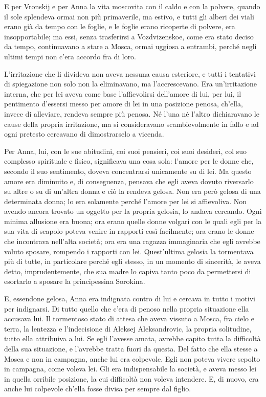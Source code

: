 E per Vronskij e per Anna la vita moscovita con il caldo e con la polvere, quando il sole splendeva ormai non più primaverile, ma estivo, e tutti gli alberi dei viali erano già da tempo con le foglie, e le foglie erano ricoperte di polvere, era insopportabile; ma essi, senza trasferirsi a Vozdvizenskoe, come era stato deciso da tempo, continuavano a stare a Mosca, ormai uggiosa a entrambi, perché negli ultimi tempi non c'era accordo fra di loro. 

L'irritazione che li divideva non aveva nessuna causa esteriore, e tutti i tentativi di spiegazione non solo non la eliminavano, ma l'accrescevano. Era un'irritazione interna, che per lei aveva come base l'affievolirsi dell'amore di lui, per lui, il pentimento d'essersi messo per amore di lei in una posizione penosa, ch'ella, invece di alleviare, rendeva sempre più penosa. Né l'una né l'altro dichiaravano le cause della propria irritazione, ma si consideravano scambievolmente in fallo e ad ogni pretesto cercavano di dimostrarselo a vicenda. 

Per Anna, lui, con le sue abitudini, coi suoi pensieri, coi suoi desideri, col suo complesso spirituale e fisico, significava una cosa sola: l'amore per le donne che, secondo il suo sentimento, doveva concentrarsi unicamente su di lei. Ma questo amore era diminuito e, di conseguenza, pensava che egli aveva dovuto riversarlo su altre o su di un'altra donna e ciò la rendeva gelosa. Non era però gelosa di una determinata donna; lo era solamente perché l'amore per lei si affievoliva. Non avendo ancora trovato un oggetto per la propria gelosia, lo andava cercando. Ogni minima allusione era buona; ora erano quelle donne volgari con le quali egli per la sua vita di scapolo poteva venire in rapporti così facilmente; ora erano le donne che incontrava nell'alta società; ora era una ragazza immaginaria che egli avrebbe voluto sposare, rompendo i rapporti con lei. Quest'ultima gelosia la tormentava più di tutte, in particolare perché egli stesso, in un momento di sincerità, le aveva detto, imprudentemente, che sua madre lo capiva tanto poco da permettersi di esortarlo a sposare la principessina Sorokina. 

E, essendone gelosa, Anna era indignata contro di lui e cercava in tutto i motivi per indignarsi. Di tutto quello che c'era di penoso nella propria situazione ella accusava lui. Il tormentoso stato di attesa che aveva vissuto a Mosca, fra cielo e terra, la lentezza e l'indecisione di Aleksej Aleksandrovic, la propria solitudine, tutto ella attribuiva a lui. Se egli l'avesse amata, avrebbe capito tutta la difficoltà della sua situazione, e l'avrebbe tratta fuori da questa. Del fatto che ella stesse a Mosca e non in campagna, anche lui era colpevole. Egli non poteva vivere sepolto in campagna, come voleva lei. Gli era indispensabile la società, e aveva messo lei in quella orribile posizione, la cui difficoltà non voleva intendere. E, di nuovo, era anche lui colpevole ch'ella fosse divisa per sempre dal figlio. 

